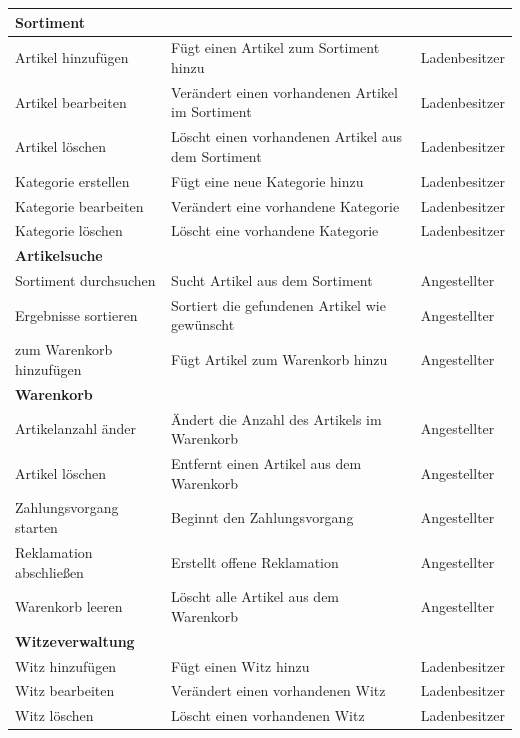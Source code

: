 \documentclass[pdftex,12pt,a4paper]{article}
\begin{document}
\begin{tabular}{|p{\third}|p{\third}|p{\third}|} \hline
\multicolumn{3}{|l|}{\textbf{Sortiment}}\\ \hline
Artikel hinzuf\"ugen & F\"ugt einen Artikel zum Sortiment hinzu & Ladenbesitzer\\ \hline
Artikel bearbeiten & Ver\"andert einen vorhandenen Artikel im Sortiment & Ladenbesitzer\\ \hline
Artikel l\"oschen & L\"oscht einen vorhandenen Artikel aus dem Sortiment & Ladenbesitzer\\ \hline
Kategorie erstellen & F\"ugt eine neue Kategorie hinzu & Ladenbesitzer\\ \hline
Kategorie bearbeiten & Ver\"andert eine vorhandene Kategorie & Ladenbesitzer\\ \hline
Kategorie l\"oschen & L\"oscht eine vorhandene Kategorie & Ladenbesitzer\\ \hline
\multicolumn{3}{|l|}{\textbf{Artikelsuche}}\\ \hline
Sortiment durchsuchen & Sucht Artikel aus dem Sortiment & Angestellter\\ \hline
Ergebnisse sortieren & Sortiert die gefundenen Artikel wie gew\"unscht & Angestellter\\ \hline
zum Warenkorb hinzuf\"ugen & F\"ugt Artikel zum Warenkorb hinzu & Angestellter\\ \hline
\multicolumn{3}{|l|}{\textbf{Warenkorb}}\\ \hline
Artikelanzahl \"ander & \"Andert die Anzahl des Artikels im Warenkorb & Angestellter\\ \hline
Artikel l\"oschen & Entfernt einen Artikel aus dem Warenkorb & Angestellter\\ \hline
Zahlungsvorgang starten & Beginnt den Zahlungsvorgang & Angestellter\\ \hline
Reklamation abschlie\ss{}en & Erstellt offene Reklamation & Angestellter\\ \hline
Warenkorb leeren & L\"oscht alle Artikel aus dem Warenkorb & Angestellter\\ \hline
\multicolumn{3}{|l|}{\textbf{Witzeverwaltung}}\\ \hline
Witz hinzuf\"ugen & F\"ugt einen Witz hinzu & Ladenbesitzer\\ \hline
Witz bearbeiten & Ver\"andert einen vorhandenen Witz & Ladenbesitzer\\ \hline
Witz l\"oschen & L\"oscht einen vorhandenen Witz & Ladenbesitzer\\ \hline
\end{tabular}
\end{document}
